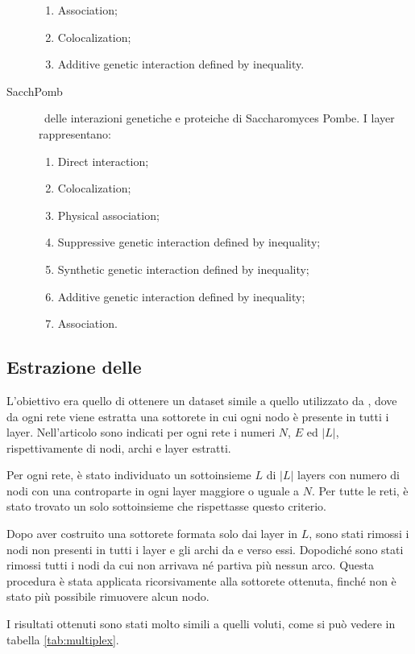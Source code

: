 \begin{description}
\begin{enumerate}
            \item Association;
            \item Colocalization;
            \item Additive genetic interaction defined by inequality.
        \end{enumerate} 
    \item[SacchPomb] \mulx\ delle interazioni genetiche e proteiche di 
        Saccharomyces Pombe. I layer rappresentano:
        \begin{enumerate}
            \item Direct interaction;
            \item Colocalization;
            \item Physical association;
            \item Suppressive genetic interaction defined by inequality;
            \item Synthetic genetic interaction defined by inequality;
            \item Additive genetic interaction defined by inequality;
            \item Association.
        \end{enumerate} 
\end{description}

\subsection{Estrazione delle \mulxs}
L'obiettivo era quello di ottenere un dataset simile a quello utilizzato da \cite{basaras:infspmul},
dove da ogni rete viene estratta una sottorete in cui ogni nodo è presente in tutti i layer.
Nell'articolo sono indicati per ogni rete i numeri $N$, $E$ ed $|L|$, rispettivamente di nodi, 
archi e layer estratti.

Per ogni rete, è stato individuato un sottoinsieme $L$ di $|L|$ layers con
numero di nodi con una controparte in ogni layer maggiore o uguale a $N$. 
Per tutte le reti, è  stato trovato un solo sottoinsieme 
che rispettasse questo criterio.

Dopo aver costruito una sottorete formata solo dai layer in $L$, sono stati rimossi i nodi non presenti
in tutti i layer e gli archi da e verso essi. Dopodiché sono stati rimossi tutti i nodi da cui non arrivava
né partiva più nessun arco. Questa procedura è stata applicata ricorsivamente alla sottorete ottenuta, 
finché non è stato più possibile rimuovere alcun nodo. 

I risultati ottenuti sono stati molto simili a quelli voluti, come si può vedere in tabella \vref{tab:multiplex}.


